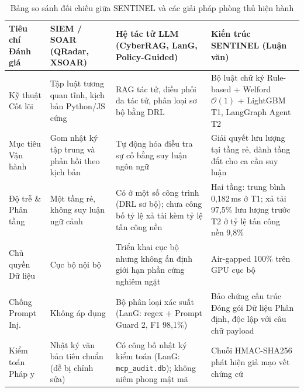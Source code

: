 \begin{table}[htbp]
\centering
\caption[So sánh đối chiếu với các giải pháp hiện hành]{Bảng so sánh đối chiếu giữa SENTINEL và các giải pháp phòng thủ hiện hành}
\label{tab:related_work_comparison}
\footnotesize
\setlength{\tabcolsep}{4pt}
\begin{tabularx}{\textwidth}{>{\raggedright\arraybackslash}p{2.6cm} >{\raggedright\arraybackslash}X >{\raggedright\arraybackslash}X >{\raggedright\arraybackslash}X}
\toprule
\textbf{Tiêu chí Đánh giá} & \textbf{SIEM / SOAR (QRadar, XSOAR)} & \textbf{Hệ tác tử LLM (CyberRAG, LanG, Policy-Guided)} & \textbf{Kiến trúc SENTINEL (Luận văn)} \\
\midrule
Kỹ thuật Cốt lõi & Tập luật tương quan tĩnh, kịch bản Python/JS cứng & RAG tác tử, điều phối đa tác tử, phân loại sơ bộ bằng DRL & Bộ luật chữ ký Rule-based + Welford $\mathcal{O}(1)$ + LightGBM T1, LangGraph Agent T2 \\
Mục tiêu Vận hành & Gom nhật ký tập trung và phản hồi theo kịch bản & Tự động hóa điều tra sự cố bằng suy luận ngôn ngữ & Giải quyết lưu lượng tại tầng rẻ, dành tầng đắt cho ca cần suy luận \\
Độ trễ \& Phân tầng & Một tầng rẻ, không suy luận ngữ cảnh & Có ở một số công trình (DRL sơ bộ); chưa công bố tỷ lệ xả tải kèm tỷ lệ tấn công nền & Hai tầng: trung bình 0,182\,ms ở T1; xả tải 97,5\% lưu lượng trước T2 ở tỷ lệ tấn công nền 9,8\% \\
Chủ quyền Dữ liệu & Cục bộ nội bộ & Triển khai cục bộ nhưng không ấn định giới hạn phần cứng nghiêm ngặt & Air-gapped 100\% trên GPU cục bộ \\
Chống Prompt Inj. & Không áp dụng & Bộ phân loại xác suất (LanG: regex + Prompt Guard 2, F1 98,1\%) & Bảo chứng cấu trúc Đóng gói Dữ liệu Phân định, độc lập với câu chữ payload \\
Kiểm toán Pháp y & Nhật ký văn bản tiêu chuẩn (dễ bị chỉnh sửa) & Có công bố nhật ký kiểm toán (LanG: \texttt{mcp\_audit.db}); không niêm phong mật mã & Chuỗi HMAC-SHA256 phát hiện giả mạo vết chứng cứ \\
\bottomrule
\end{tabularx}
\end{table}
